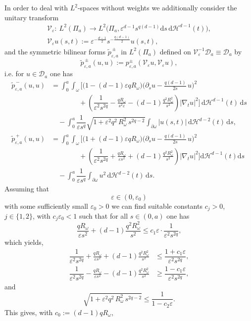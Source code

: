 \documentclass[11pt,oneside,reqno,a4paper]{amsart}
\renewcommand{\Tilde}{\widetilde}
\newcommand{\dd}{\mathrm{d}}
\newcommand{\cD}{\mathcal{D}}
\newcommand{\cV}{\mathcal{V}}
\renewcommand{\H}{\mathcal{H}}
\newcommand{\eps}{\varepsilon}
\theoremstyle{definition}
\begin{document}
In order to deal with $L^2$-spaces without weights we additionally consider the unitary
transform
\begin{gather*}
\cV_\eps:\ L^2(\Pi_a)\to L^2(\Pi_a,\eps^{d-1}s^{q(d-1)}\dd s\,\dd\H^{d-1}(t)\big),\\
\cV_\eps u(s,t):=\eps^{-\frac{d-1}{2}}s^{-\frac{q(d-1)}{2}}u(s,t),
\end{gather*}
and the symmetric bilinear forms $\Tilde p^{\,\pm}_{\eps,a}$ in $L^2(\Pi_a)$ defined
on $\cV_\eps^{-1} \cD_a \equiv \cD_a$
by
\[
\Tilde p^{\,\pm}_{\eps,a}(u,u):=p^\pm_{\eps,a}(\cV_\eps u,\cV_\eps u),
\]
i.e. for $u\in  \cD_a$ one has
\begin{align*}
\Tilde p^{\,-}_{\eps,a}(u,u)&=\int_0^a \int_{\omega}\Bigg[\big(1-(d-1)\eps qR_\omega\big)\Big(\partial_su -\frac{q(d-1)}{2s}\, u\Big)^2\\
&\qquad\qquad +\left(\dfrac{1}{\eps^2s^{2q}}-\frac{qR_\omega}{s^2\eps}-(d-1)\frac{q^2R^2_\omega}{s^2}\right)|\nabla_tu|^2\Bigg]\,\dd\H^{d-1}(t)\,\dd s\\
&\quad- \int_0^a \dfrac{1}{\eps s^q}
\sqrt{1+\eps^2q^2\,R_\omega^2\,s^{2q-2}}\int_{\partial\omega}\big|u(s,t)\big|\,\dd\H^{d-2}(t)\,\dd s,\\
\Tilde p^{\,+}_{\eps,a}(u,u)&=\int_0^a\int_{\omega}\Bigg[\big(1+(d-1)\eps qR_\omega\big)\Big(\partial_su -\frac{q(d-1)}{2s}\, u\Big)^2
	\\ &\qquad\qquad +\left( \dfrac{1}{\eps^2s^{2q}}+\frac{qR_\omega}{\eps s^2}+(d-1)\frac{q^2R^2_\omega}{s^2}\right)|\nabla_tu|^2\Bigg]\dd\H^{d-1}(t)\dd s\\
	&\quad -\int_0^a\dfrac{1}{\eps s^q} \int_{\partial\omega} u^2\,\dd\H^{d-2}(t)\,\dd s.
\end{align*}
Assuming that
\[
\eps\in(0,\eps_0)
\]
with some sufficiently small $\eps_0>0$ we can find suitable constants $c_j>0$,  $j\in\{1,2\}$, with $c_j\eps_0<1$
such that for all $s\in(0,a)$ one has
\[
\frac{qR_\omega}{\eps s^2}+(d-1)\frac{q^2R^2_\omega}{s^2}\le c_1\eps\cdot \dfrac{1}{\eps^2 s^{2q}},
\]
which yields,
\begin{align*}
	\dfrac{1}{\eps^2s^{2q}}+\frac{qR_\omega}{\eps s^2}+(d-1)\frac{q^2R^2_\omega}{s^2}&\le \dfrac{1+c_1\eps}{\eps^2 s^{2q}},\\
	\dfrac{1}{\eps^2s^{2q}}-\frac{qR_\omega}{\eps s^2}-(d-1)\frac{q^2R^2_\omega}{s^2}&\ge \dfrac{1-c_1\eps}{\eps^2 s^{2q}},
\end{align*}
and
\[
\sqrt{1+\eps^2q^2\,R_\omega^2\,s^{2q-2}}\le \dfrac{1}{1-c_2\eps}.
\]
This gives, with $c_0:=(d-1)qR_\omega$,
\end{document}
